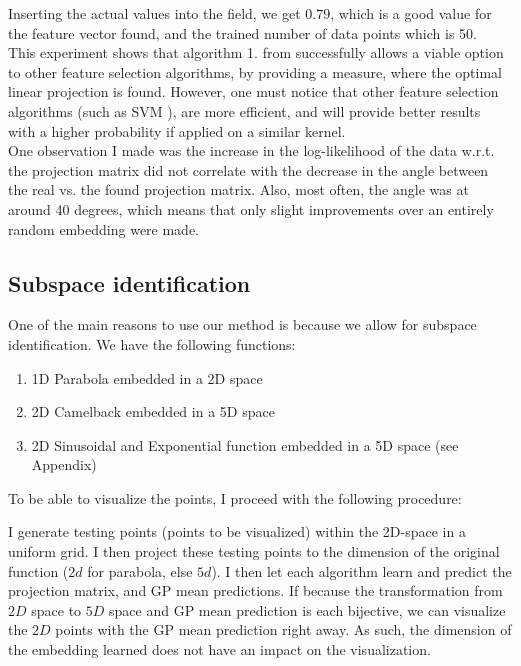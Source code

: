 Inserting the actual values into the field, we get $0.79$, which is a good value for the feature vector found, and the trained number of data points which is 50. \\
 
 This experiment shows that algorithm 1. from \citep{Tripathy} successfully allows a viable option to other feature selection algorithms, by providing a measure, where the optimal linear projection is found. 
 However, one must notice that other feature selection algorithms (such as SVM \citep{SVMFeature}), are more efficient, and will provide better results with a higher probability if applied on a similar kernel. \\
 
 One observation I made was the increase in the log-likelihood of the data w.r.t. the projection matrix did not correlate with the decrease in the angle between the real vs. the found projection matrix.
 Also, most often, the angle was at around 40 degrees, which means that only slight improvements over an entirely random embedding were made.


\subsection{Subspace identification}
One of the main reasons to use our method is because we allow for subspace identification.
We have the following functions:

\begin{enumerate}
\item 1D Parabola embedded in a 2D space
\item 2D Camelback embedded in a 5D space
\item 2D Sinusoidal and Exponential function embedded in a 5D space (see Appendix)
\end{enumerate}

To be able to visualize the points, I proceed with the following procedure:

I generate testing points (points to be visualized) within the 2D-space in a uniform grid.
I then project these testing points to the dimension of the original function ($2d$ for parabola, else $5d$).
I then let each algorithm learn and predict the projection matrix, and GP mean predictions.
If because the transformation from $2D$ space to $5D$ space and GP mean prediction is each bijective, we can visualize the $2D$ points with the GP mean prediction right away.
As such, the dimension of the embedding learned does not have an impact on the visualization.

